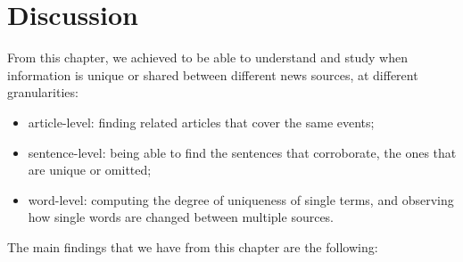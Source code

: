 



\section{\statusgreen Discussion}
\label{sec:cgs_findings}

From this chapter, we achieved to be able to understand and study when information is unique or shared between different news sources, at different granularities:
\begin{itemize}
    \item article-level: finding related articles that cover the same events;
    \item sentence-level: being able to find the sentences that corroborate, the ones that are unique or omitted;
    \item word-level: computing the degree of uniqueness of single terms, and observing how single words are changed between multiple sources.
\end{itemize}


The main findings that we have from this chapter are the following:

